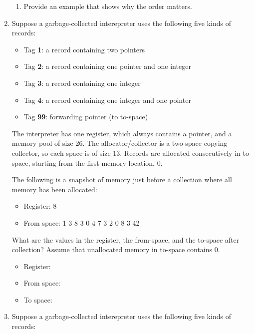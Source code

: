 \begin{enumerate}
\begin{enumerate}
  \item Provide an example that shows why the order matters.

\end{enumerate}

\item Suppose a garbage-collected interepreter uses the following five kinds of records:

  \begin{itemize}
  \item Tag \textbf{1}: a record containing two pointers
  \item Tag \textbf{2}: a record containing one pointer and one integer
  \item Tag \textbf{3}: a record containing one integer
  \item Tag \textbf{4}: a record containing one integer and one pointer
  \item Tag \textbf{99}: forwarding pointer (to to-space)
  \end{itemize}

 The interpreter has one register, which always contains a pointer,
 and a memory pool of size 26. The allocator/collector is a two-space
 copying collector, so each space is of size 13. Records are allocated
 consecutively in to-space, starting from the first memory location,
 0.

 The following is a snapshot of memory just before a collection where
 all memory has been allocated:

 \begin{itemize}
 \item Register: 8
 \item From space: 1 3 8 3 0 4 7 3 2 0 8 3 42
 \end{itemize}

What are the values in the register, the from-space, and the to-space after collection?
Assume that unallocated memory in to-space contains 0.

 \begin{itemize}
 \item Register:

 \item From space:

 \item To space:
 \end{itemize}

\item
Suppose a garbage-collected interepreter uses the following five kinds of records:


\end{enumerate}
